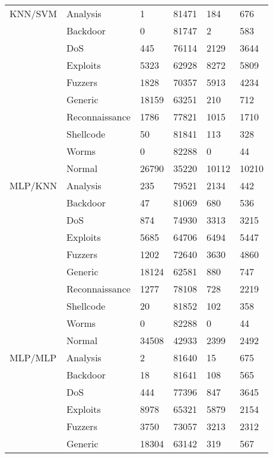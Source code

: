 \begin{longtable}{@{}llllll@{}}
KNN/SVM & Analysis       & 1     & 81471 & 184   & 676   \\
        & Backdoor       & 0     & 81747 & 2     & 583   \\
        & DoS            & 445   & 76114 & 2129  & 3644  \\
        & Exploits       & 5323  & 62928 & 8272  & 5809  \\
        & Fuzzers        & 1828  & 70357 & 5913  & 4234  \\
        & Generic        & 18159 & 63251 & 210   & 712   \\
        & Reconnaissance & 1786  & 77821 & 1015  & 1710  \\
        & Shellcode      & 50    & 81841 & 113   & 328   \\
        & Worms          & 0     & 82288 & 0     & 44    \\
        & Normal         & 26790 & 35220 & 10112 & 10210 \\
MLP/KNN & Analysis       & 235   & 79521 & 2134  & 442   \\
        & Backdoor       & 47    & 81069 & 680   & 536   \\
        & DoS            & 874   & 74930 & 3313  & 3215  \\
        & Exploits       & 5685  & 64706 & 6494  & 5447  \\
        & Fuzzers        & 1202  & 72640 & 3630  & 4860  \\
        & Generic        & 18124 & 62581 & 880   & 747   \\
        & Reconnaissance & 1277  & 78108 & 728   & 2219  \\
        & Shellcode      & 20    & 81852 & 102   & 358   \\
        & Worms          & 0     & 82288 & 0     & 44    \\
        & Normal         & 34508 & 42933 & 2399  & 2492  \\
MLP/MLP & Analysis       & 2     & 81640 & 15    & 675   \\
        & Backdoor       & 18    & 81641 & 108   & 565   \\
        & DoS            & 444   & 77396 & 847   & 3645  \\
        & Exploits       & 8978  & 65321 & 5879  & 2154  \\
        & Fuzzers        & 3750  & 73057 & 3213  & 2312  \\
        & Generic        & 18304 & 63142 & 319   & 567   \\

\end{longtable}
